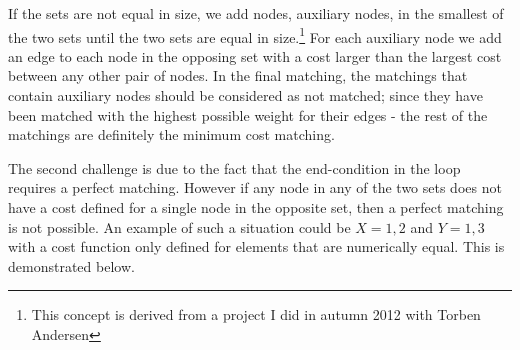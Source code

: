 \documentclass[11pt]{article}
\begin{document}
If the sets are not equal in size, we add nodes, auxiliary nodes, in the smallest of the two sets until the two sets are equal in size.\footnote{This concept is derived from a project I did in autumn 2012 with Torben Andersen} For each auxiliary node we add an edge to each node in the opposing set with a cost larger than the largest cost between any other pair of nodes. In the final matching, the matchings that contain auxiliary nodes should be considered as not matched; since they have been matched with the highest possible weight for their edges - the rest of the matchings are definitely the minimum cost matching.


The second challenge is due to the fact that the end-condition in the loop requires a perfect matching. However if any node in any of the two sets does not have a cost defined for a single node in the opposite set, then a perfect matching is not possible. An example of such a situation could be $X={1, 2}$ and $Y={1, 3}$ with a cost function only defined for elements that are numerically equal. This is demonstrated below. \\
\end{document}
